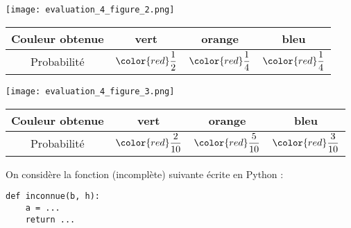 \documentclass[a4paper,dvipsnames]{article}
\begin{document}
\begin{multicols}{2}
  \begin{center}
    \texttt{[image: evaluation\_4\_figure\_2.png]}
  \end{center}

  \begin{center}
    \vspace*{0.7cm}
    \hspace*{-3cm}\begin{tabular}{@{}cccc@{}}
      \toprule
      Couleur obtenue & vert & orange & bleu\\
      \midrule
      Probabilité & $\color{red}\dfrac{1}{2}$ & $\color{red}\dfrac{1}{4}$ & $\color{red}\dfrac{1}{4}$\\
      \bottomrule
    \end{tabular}
  \end{center}
\end{multicols}

\begin{multicols}{2}
  \begin{center}
    \texttt{[image: evaluation\_4\_figure\_3.png]}
  \end{center}

  \begin{center}
    \vspace*{0.75cm}
    \hspace*{-3cm}\begin{tabular}{@{}cccc@{}}
      \toprule
      Couleur obtenue & vert & orange & bleu\\
      \midrule
      Probabilité & $\color{red}\dfrac{2}{10}$ & $\color{red}\dfrac{5}{10}$ & $\color{red}\dfrac{3}{10}$\\
      \bottomrule
    \end{tabular}
  \end{center}
\end{multicols}

\bigskip

\exo On considère la fonction (incomplète) suivante écrite en Python :

\begin{verbatim}
def inconnue(b, h):
    a = ...
    return ...
\end{verbatim}
\end{document}

